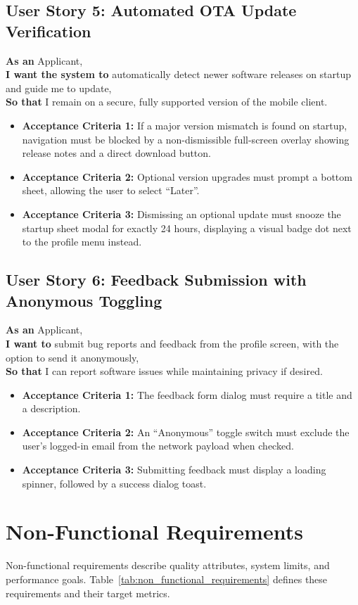 \subsection{User Story 5: Automated OTA Update Verification}
\textbf{As an} Applicant,\\
\textbf{I want the system to} automatically detect newer software releases on startup and guide me to update,\\
\textbf{So that} I remain on a secure, fully supported version of the mobile client.
\begin{itemize}
    \item \textbf{Acceptance Criteria 1:} If a major version mismatch is found on startup, navigation must be blocked by a non-dismissible full-screen overlay showing release notes and a direct download button.
    \item \textbf{Acceptance Criteria 2:} Optional version upgrades must prompt a bottom sheet, allowing the user to select ``Later''.
    \item \textbf{Acceptance Criteria 3:} Dismissing an optional update must snooze the startup sheet modal for exactly 24 hours, displaying a visual badge dot next to the profile menu instead.
\end{itemize}

\subsection{User Story 6: Feedback Submission with Anonymous Toggling}
\textbf{As an} Applicant,\\
\textbf{I want to} submit bug reports and feedback from the profile screen, with the option to send it anonymously,\\
\textbf{So that} I can report software issues while maintaining privacy if desired.
\begin{itemize}
    \item \textbf{Acceptance Criteria 1:} The feedback form dialog must require a title and a description.
    \item \textbf{Acceptance Criteria 2:} An ``Anonymous'' toggle switch must exclude the user's logged-in email from the network payload when checked.
    \item \textbf{Acceptance Criteria 3:} Submitting feedback must display a loading spinner, followed by a success dialog toast.
\end{itemize}

\section{Non-Functional Requirements}
Non-functional requirements describe quality attributes, system limits, and performance goals. Table~\ref{tab:non_functional_requirements} defines these requirements and their target metrics.

